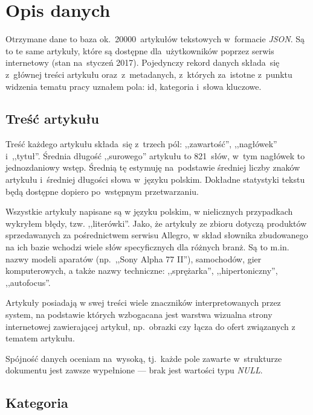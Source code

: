 \documentclass[pl]{minipw} %
\begin{document}
\section{Opis danych}

Otrzymane dane to baza ok.~20000~artykułów tekstowych w~formacie \textit{JSON}. Są to te same artykuły, które są dostępne dla~użytkowników poprzez serwis internetowy (stan na~styczeń 2017). Pojedynczy rekord danych składa~się z~głównej treści artykułu oraz~z~metadanych, z~których za~istotne z~punktu widzenia tematu pracy uznałem pola: id, kategoria i~słowa kluczowe.

\subsection{Treść artykułu}

Treść każdego artykułu składa~się z~trzech pól: ,,zawartość'', ,,nagłówek'' i~,,tytuł''. Średnia długość ,,surowego'' artykułu to 821~słów, w~tym nagłówek to jednozdaniowy wstęp. Średnią tę estymuję na~podstawie średniej liczby znaków artykułu i~średniej długości słowa w~języku polskim. Dokładne statystyki tekstu będą dostępne dopiero po~wstępnym przetwarzaniu.

Wszystkie artykuły napisane są w języku polskim, w nielicznych przypadkach wykryłem błędy, tzw. ,,literówki''. Jako, że artykuły ze zbioru dotyczą produktów sprzedawanych za pośrednictwem serwisu Allegro, w skład słownika zbudowanego na ich bazie wchodzi wiele słów specyficznych dla różnych branż. Są to m.in. nazwy modeli aparatów (np.~,,Sony Alpha 77 II''), samochodów, gier komputerowych, a także nazwy techniczne: ,,sprężarka'', ,,hipertoniczny'', ,,autofocus''.

Artykuły posiadają w swej treści wiele znaczników interpretowanych przez system, na podstawie których wzbogacana jest warstwa wizualna strony internetowej zawierającej artykuł, np.~obrazki czy łącza do ofert związanych z tematem artykułu.

Spójność danych oceniam na~wysoką, tj.~każde pole zawarte w~strukturze dokumentu jest zawsze wypełnione --- brak jest wartości typu \textit{NULL}.

\subsection{Kategoria}
\end{document}
